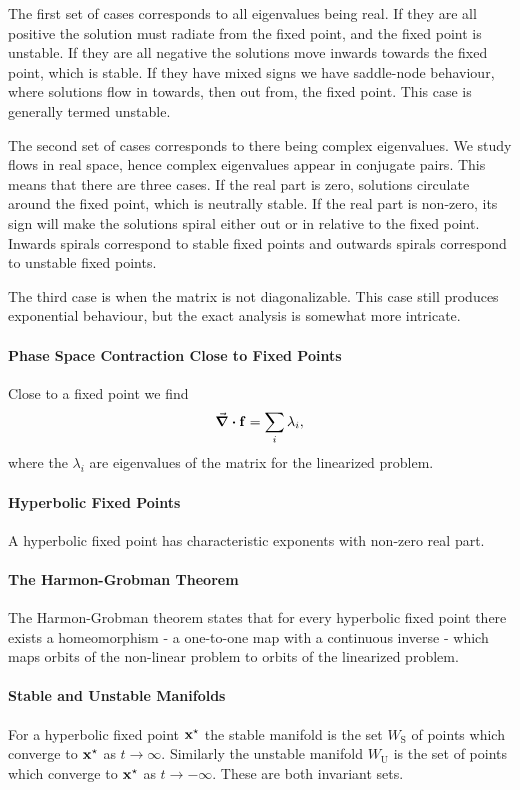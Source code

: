 The first set of cases corresponds to all eigenvalues being real. If they are all positive the solution must radiate from the fixed point, and the fixed point is unstable. If they are all negative the solutions move inwards towards the fixed point, which is stable. If they have mixed signs we have saddle-node behaviour, where solutions flow in towards, then out from, the fixed point. This case is generally termed unstable.

The second set of cases corresponds to there being complex eigenvalues. We study flows in real space, hence complex eigenvalues appear in conjugate pairs. This means that there are three cases. If the real part is zero, solutions circulate around the fixed point, which is neutrally stable. If the real part is non-zero, its sign will make the solutions spiral either out or in relative to the fixed point. Inwards spirals correspond to stable fixed points and outwards spirals correspond to unstable fixed points.

The third case is when the matrix is not diagonalizable. This case still produces exponential behaviour, but the exact analysis is somewhat more intricate.

\paragraph{Phase Space Contraction Close to Fixed Points}
Close to a fixed point we find
\begin{align*}
	\div{\vb{f}} = \sum\limits_{i}\lambda_{i},
\end{align*}
where the $\lambda_{i}$ are eigenvalues of the matrix for the linearized problem.

\paragraph{Hyperbolic Fixed Points}
A hyperbolic fixed point has characteristic exponents with non-zero real part.

\paragraph{The Harmon-Grobman Theorem}
The Harmon-Grobman theorem states that for every hyperbolic fixed point there exists a homeomorphism - a one-to-one map with a continuous inverse - which maps orbits of the non-linear problem to orbits of the linearized problem.

\paragraph{Stable and Unstable Manifolds}
For a hyperbolic fixed point $\vb{x}^{\star}$ the stable manifold is the set $W_{\text{S}}$ of points which converge to $\vb{x}^{\star}$ as $t\to\infty$. Similarly the unstable manifold $W_{\text{U}}$ is the set of points which converge to $\vb{x}^{\star}$ as $t\to -\infty$. These are both invariant sets.

